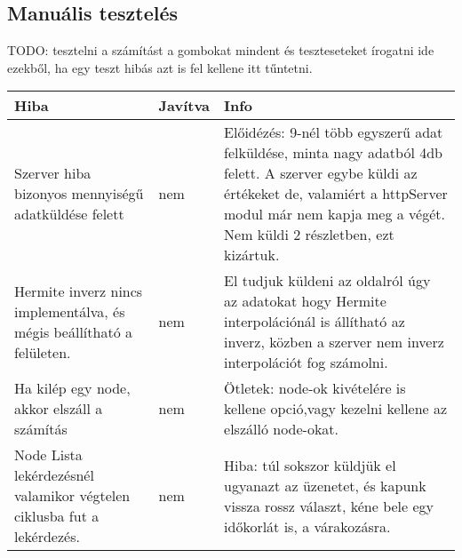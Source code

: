 \subsection{Manuális tesztelés}
	TODO: tesztelni a számítást a gombokat mindent és teszteseteket írogatni ide ezekből, 
	ha egy teszt hibás azt is fel kellene itt tűntetni.
	\begin{center}
  	\begin{tabular}{| p{4cm} | p{1.5cm} | p{8cm} |}
    \hline
    Hiba & Javítva & Info
    \\ \hline
    	Szerver hiba bizonyos mennyiségű adatküldése felett 
      &
    	nem
      &  
    	Előidézés: 9-nél több egyszerű adat felküldése, minta nagy adatból 4db felett.
    	A szerver egybe küldi az értékeket de, valamiért a httpServer modul már nem kapja meg a végét. Nem küldi 2 részletben, ezt kizártuk.
    \\ \hline
    	Hermite inverz nincs implementálva, és mégis beállítható a felületen.  
      &
      	nem
      &
		El tudjuk küldeni az oldalról úgy az adatokat hogy Hermite interpolációnál is állítható az inverz, közben a szerver nem inverz interpolációt fog számolni.
    \\ \hline
        Ha kilép egy node, akkor elszáll a számítás 
      &
      	nem
      &
		Ötletek: node-ok kivételére is kellene opció,vagy kezelni kellene az elszálló node-okat.
    \\ \hline
        Node Lista lekérdezésnél valamikor végtelen ciklusba fut a lekérdezés. 
      &
      	nem
      &
		Hiba: túl sokszor küldjük el ugyanazt az üzenetet, és kapunk vissza rossz választ, kéne bele egy időkorlát is, a várakozásra. 
    \\ \hline
  	\end{tabular}
	\end{center}